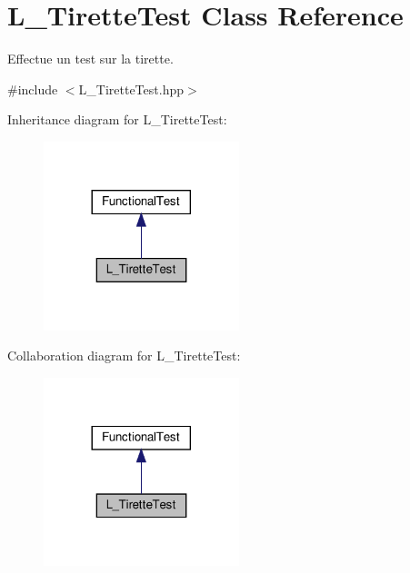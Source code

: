 \hypertarget{classL__TiretteTest}{}\section{L\+\_\+\+Tirette\+Test Class Reference}
\label{classL__TiretteTest}


Effectue un test sur la tirette.  




{\ttfamily \#include $<$L\+\_\+\+Tirette\+Test.\+hpp$>$}



Inheritance diagram for L\+\_\+\+Tirette\+Test\+:
\nopagebreak
\begin{figure}[H]
\begin{center}
\leavevmode
\includegraphics[width=161pt]{classL__TiretteTest__inherit__graph}
\end{center}
\end{figure}


Collaboration diagram for L\+\_\+\+Tirette\+Test\+:
\nopagebreak
\begin{figure}[H]
\begin{center}
\leavevmode
\includegraphics[width=161pt]{classL__TiretteTest__coll__graph}
\end{center}
\end{figure}
